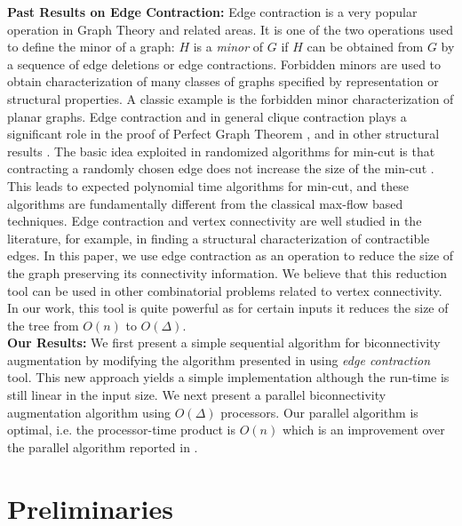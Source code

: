 \documentclass[runningheads]{llncs}
\begin{document}
{\bf Past Results on Edge Contraction:} Edge contraction is a very popular operation in Graph Theory and related areas.  It is one of the two operations used to define the minor of a graph: $H$ is a {\em minor} of $G$ if $H$ can be obtained from $G$ by a sequence of edge deletions or edge contractions.    Forbidden minors are used to obtain characterization of many classes of graphs specified by representation or structural properties. A classic example is the forbidden minor characterization of planar graphs.  Edge contraction and in general clique contraction plays a significant role in the proof of Perfect Graph Theorem \cite{golu}, and in other structural results \cite{matthias}.  The basic idea exploited in randomized algorithms for min-cut is that contracting a randomly chosen edge does not increase the size of the min-cut \cite{karger}.  This leads to expected polynomial time algorithms for min-cut, and these algorithms are fundamentally different from the classical max-flow based techniques.  Edge contraction and vertex connectivity are well studied in the literature, for example, in finding a structural characterization of contractible edges.  In this paper, we use edge contraction as an operation to reduce the size of the graph preserving its connectivity information.  We believe that this reduction tool can be used in other combinatorial problems related to vertex connectivity.  In our work, this tool is quite powerful as for certain inputs it reduces the size of the tree from $O(n)$ to $O(\Delta)$.\\ 
{\bf Our Results:} We first present a simple sequential algorithm for biconnectivity augmentation by modifying the algorithm presented in \cite{nsn} using {\em edge contraction} tool.  This new approach yields a simple implementation although the run-time is still linear in the input size.  We next present a parallel biconnectivity augmentation algorithm using $O(\Delta)$ processors.  Our parallel algorithm is optimal, i.e. the processor-time product is $O(n)$ which is an improvement over the parallel algorithm reported in \cite{hsu}.
\section{Preliminaries}
\end{document}

